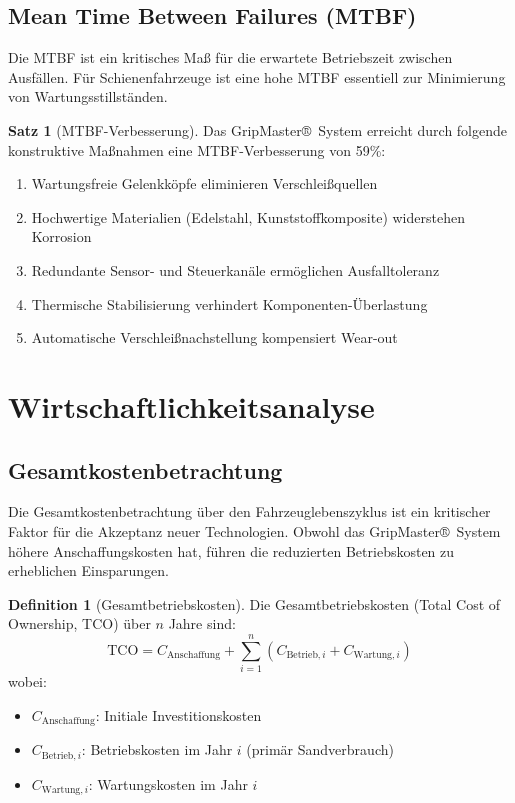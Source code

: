 \documentclass[a4paper,12pt]{article}
\theoremstyle{definition}
\newtheorem{definition}{Definition}
\newtheorem{satz}{Satz}
\begin{document}
\subsection{Mean Time Between Failures (MTBF)}

Die MTBF ist ein kritisches Maß für die erwartete Betriebszeit zwischen Ausfällen. Für Schienenfahrzeuge ist eine hohe MTBF essentiell zur Minimierung von Wartungsstillständen.

\begin{satz}[MTBF-Verbesserung]
	Das GripMaster®~System erreicht durch folgende konstruktive Maßnahmen eine MTBF-Verbesserung von 59\%:
	\begin{enumerate}
		\item Wartungsfreie Gelenkköpfe eliminieren Verschleißquellen
		\item Hochwertige Materialien (Edelstahl, Kunststoffkomposite) widerstehen Korrosion
		\item Redundante Sensor- und Steuerkanäle ermöglichen Ausfalltoleranz
		\item Thermische Stabilisierung verhindert Komponenten-Überlastung
		\item Automatische Verschleißnachstellung kompensiert Wear-out
	\end{enumerate}
\end{satz}

\section{Wirtschaftlichkeitsanalyse}

\subsection{Gesamtkostenbetrachtung}

Die Gesamtkostenbetrachtung über den Fahrzeuglebenszyklus ist ein kritischer Faktor für die Akzeptanz neuer Technologien. Obwohl das GripMaster®~System höhere Anschaffungskosten hat, führen die reduzierten Betriebskosten zu erheblichen Einsparungen.

\begin{definition}[Gesamtbetriebskosten]
	Die Gesamtbetriebskosten (Total Cost of Ownership, TCO) über $n$ Jahre sind:
	\[
	\text{TCO} = C_{\text{Anschaffung}} + \sum_{i=1}^{n} (C_{\text{Betrieb},i} + C_{\text{Wartung},i})
	\]
	wobei:
	\begin{itemize}
		\item $C_{\text{Anschaffung}}$: Initiale Investitionskosten
		\item $C_{\text{Betrieb},i}$: Betriebskosten im Jahr $i$ (primär Sandverbrauch)
		\item $C_{\text{Wartung},i}$: Wartungskosten im Jahr $i$
	\end{itemize}
\end{definition}
\end{document}
